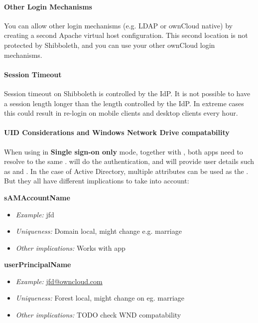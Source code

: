 \documentclass[letterpaper,10pt,english]{sphinxmanual}
\begin{document}
\paragraph{Other Login Mechanisms}
\label{enterprise_user_management/user_auth_shibboleth:other-login-mechanisms}
You can allow other login mechanisms (e.g. LDAP or ownCloud native) by creating
a second Apache virtual host configuration. This second location is not
protected by Shibboleth, and you can use your other ownCloud login mechanisms.


\paragraph{Session Timeout}
\label{enterprise_user_management/user_auth_shibboleth:session-timeout}
Session timeout on Shibboleth is controlled by the IdP. It is not possible to
have a session length longer than the length controlled by the IdP. In extreme
cases this could result in re-login on mobile clients and desktop clients every
hour.


\paragraph{UID Considerations and Windows Network Drive compatability}
\label{enterprise_user_management/user_auth_shibboleth:uid-considerations-and-windows-network-drive-compatability}
When using  in \textbf{Single sign-on only} mode, together with
, both apps need to resolve to the same .
 will do the authentication, and  will provide
user details such as  and . In the case of Active
Directory, multiple attributes can be used as the . But they all have
different implications to take into account:

\textbf{sAMAccountName}
\begin{itemize}
\item {} 
\emph{Example:} jfd

\item {} 
\emph{Uniqueness:} Domain local, might change e.g. marriage

\item {} 
\emph{Other implications:} Works with  app

\end{itemize}

\textbf{userPrincipalName}
\begin{itemize}
\item {} 
\emph{Example:} \href{mailto:jfd@owncloud.com}{jfd@owncloud.com}

\item {} 
\emph{Uniqueness:} Forest local, might change on eg. marriage

\item {} 
\emph{Other implications:} TODO check WND compatability

\end{itemize}
\end{document}
